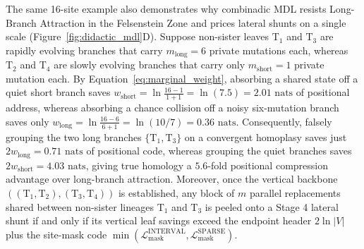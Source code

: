 \documentclass[11pt,a4paper]{article}
\begin{document}
The same 16-site example also demonstrates why combinadic MDL resists Long-Branch Attraction in the Felsenstein Zone \citep{felsenstein1978cases} and prices lateral shunts on a single scale (Figure~\ref{fig:didactic_mdl}D). Suppose non-sister leaves $\text{T}_1$ and $\text{T}_3$ are rapidly evolving branches that carry $m_{\text{long}} = 6$ private mutations each, whereas $\text{T}_2$ and $\text{T}_4$ are slowly evolving branches that carry only $m_{\text{short}} = 1$ private mutation each. By Equation~\eqref{eq:marginal_weight}, absorbing a shared state off a quiet short branch saves $w_{\text{short}} = \ln\frac{16 - 1}{1 + 1} = \ln(7.5) = 2.01\text{ nats}$ of positional address, whereas absorbing a chance collision off a noisy six-mutation branch saves only $w_{\text{long}} = \ln\frac{16 - 6}{6 + 1} = \ln(10/7) = 0.36\text{ nats}$. Consequently, falsely grouping the two long branches $\{\text{T}_1, \text{T}_3\}$ on a convergent homoplasy saves just $2 w_{\text{long}} = 0.71\text{ nats}$ of positional code, whereas grouping the quiet branches saves $2 w_{\text{short}} = 4.03\text{ nats}$, giving true homology a $5.6$-fold positional compression advantage over long-branch attraction. Moreover, once the vertical backbone $((\text{T}_1,\text{T}_2),(\text{T}_3,\text{T}_4))$ is established, any block of $m$ parallel replacements shared between non-sister lineages $\text{T}_1$ and $\text{T}_3$ is peeled onto a Stage 4 lateral shunt if and only if its vertical leaf savings exceed the endpoint header $2\ln|V|$ plus the site-mask code $\min(\mathcal{L}_{\text{mask}}^{\text{INTERVAL}}, \mathcal{L}_{\text{mask}}^{\text{SPARSE}})$.
\end{document}
